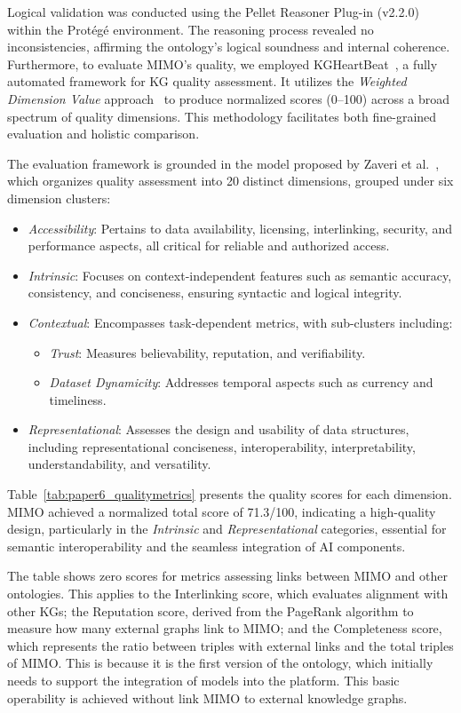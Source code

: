 Logical validation was conducted using the Pellet Reasoner Plug-in (v2.2.0) within the Protégé environment. The reasoning process revealed no inconsistencies, affirming the ontology’s logical soundness and internal coherence. Furthermore, to evaluate MIMO's quality, we employed KGHeartBeat~\cite{pellegrino_kgheartbeat_2025}, a fully automated framework for KG quality assessment. It utilizes the \textit{Weighted Dimension Value} approach~\cite{debattista_luzzumethodology_2016} to produce normalized scores (0--100) across a broad spectrum of quality dimensions.
This methodology facilitates both fine-grained evaluation and holistic comparison.

The evaluation framework is grounded in the model proposed by Zaveri et al.~\cite{zaveri_2015}, which organizes quality assessment into 20 distinct dimensions, grouped under six dimension clusters:
\begin{itemize}
    \item \textit{Accessibility}: Pertains to data availability, licensing, interlinking, security, and performance aspects, all critical for reliable and authorized access.
    \item \textit{Intrinsic}: Focuses on context-independent features such as semantic accuracy, consistency, and conciseness, ensuring syntactic and logical integrity.
    \item \textit{Contextual}: Encompasses task-dependent metrics, with sub-clusters including:
    \begin{itemize}
        \item \textit{Trust}: Measures believability, reputation, and verifiability.
        \item \textit{Dataset Dynamicity}: Addresses temporal aspects such as currency and timeliness.
    \end{itemize}
    \item \textit{Representational}: Assesses the design and usability of data structures, including representational conciseness, interoperability, interpretability, understandability, and versatility.
\end{itemize}
%
Table~\ref{tab:paper6_qualitymetrics} presents the quality scores for each dimension. MIMO achieved a normalized total score of 71.3/100, indicating a high-quality design, particularly in the \textit{Intrinsic} and \textit{Representational} categories, essential for semantic interoperability and the seamless integration of AI components.

The table shows zero scores for metrics assessing links between MIMO and other ontologies. This applies to the Interlinking score, which evaluates alignment with other KGs; the Reputation score, derived from the PageRank algorithm to measure how many external graphs link to MIMO; and the Completeness score, which represents the ratio between triples with external links and the total triples of MIMO. This is because it is the first version of the ontology, which initially needs to support the integration of models into the platform. This basic operability is achieved without link MIMO to external knowledge graphs.

